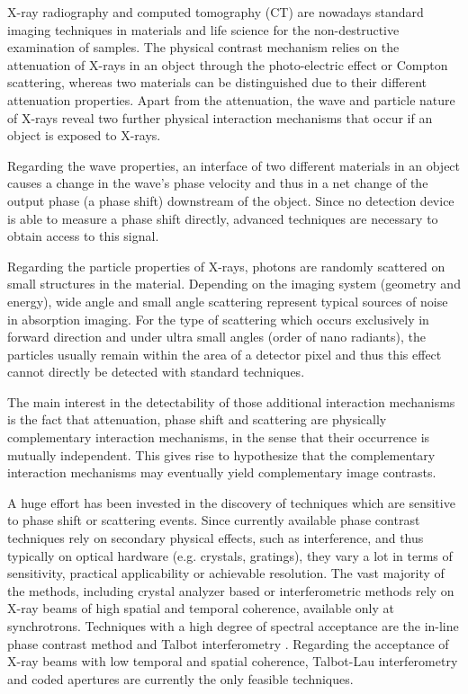 \documentclass[aip,apl,amsmath,amssymb,floatfix,reprint,a4paper]{revtex4-1}
\begin{document}
X-ray radiography and computed tomography (CT) are nowadays standard imaging techniques in materials and life science for the non-destructive examination of samples. The physical contrast mechanism relies on the attenuation of X-rays in an object through the photo-electric effect or Compton scattering, whereas two materials can be distinguished due to their different attenuation properties. Apart from the attenuation, the wave and particle nature of X-rays reveal two further physical interaction mechanisms that occur if an object is exposed to X-rays.

Regarding the wave properties, an interface of two different materials in an object causes a change in the wave's phase velocity and thus in a net change of the output phase (a phase shift) downstream of the object. Since no detection device is able to measure a phase shift directly, advanced techniques are necessary to obtain access to this signal.

Regarding the particle properties of X-rays, photons are randomly scattered on small structures in the material. Depending on the imaging system (geometry and energy), wide angle and small angle scattering represent typical sources of noise in absorption imaging. For the type of scattering which occurs exclusively in forward direction and under ultra small angles (order of nano radiants), the particles usually remain within the area of a detector pixel and thus this effect cannot directly be detected with standard techniques.

The main interest in the detectability of those additional interaction mechanisms is the fact that attenuation, phase shift and scattering are physically complementary interaction mechanisms, in the sense that their occurrence is mutually independent. This gives rise to hypothesize that the complementary interaction mechanisms may eventually yield complementary image contrasts.

A huge effort has been invested in the discovery of techniques which are sensitive to phase shift or scattering events. Since currently available phase contrast techniques rely on secondary physical effects, such as interference, and thus typically on optical hardware (e.g. crystals, gratings), they vary a lot in terms of sensitivity, practical applicability or achievable resolution. The vast majority of the methods, including crystal analyzer based \cite{Davis1995,Chapman1997} or interferometric \cite{Bonse1965,Momose1996} methods rely on X-ray beams of high spatial and temporal coherence, available only at synchrotrons. Techniques with a high degree of spectral acceptance are the in-line phase contrast method \cite{Snigirev1995,Wilkins1996,Cloetens1996} and Talbot interferometry \cite{Cloetens1997,David2002,Momose2003a}. Regarding the acceptance of X-ray beams with low temporal and spatial coherence, Talbot-Lau interferometry \cite{Pfeiffer2006} and coded apertures \cite{Munro2012} are currently the only feasible techniques.
\end{document}
